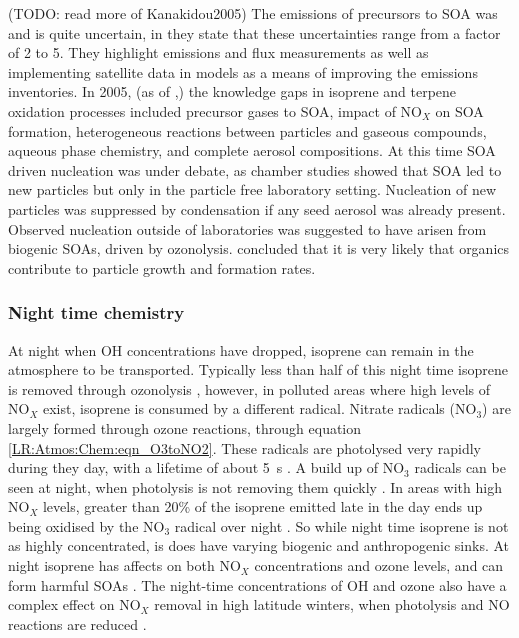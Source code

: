     (TODO: read more of Kanakidou2005)
    The emissions of precursors to SOA was and is quite uncertain, in \cite{Kanakidou2005} they state that these uncertainties range from a factor of 2 to 5.
    They highlight emissions and flux measurements as well as implementing satellite data in models as a means of improving the emissions inventories.
    In 2005, (as of \cite{Kanakidou2005},) the knowledge gaps in isoprene and terpene oxidation processes included precursor gases to SOA, impact of NO$_X$ on SOA formation, heterogeneous reactions between particles and gaseous compounds, aqueous phase chemistry, and complete aerosol compositions.
    At this time SOA driven nucleation was under debate, as chamber studies showed that SOA led to new particles but only in the particle free laboratory setting. 
    Nucleation of new particles was suppressed by condensation if any seed aerosol was already present.
    Observed nucleation outside of laboratories was suggested to have arisen from biogenic SOAs, driven by ozonolysis.
    \cite{Kanakidou2005} concluded that it is very likely that organics contribute to particle growth and formation rates.
    
    
    \subsubsection{Night time chemistry}
    At night when OH concentrations have dropped, isoprene can remain in the atmosphere to be transported. 
    Typically less than half of this night time isoprene is removed through ozonolysis \citep{AtkinsonArey2003}, however, in polluted areas where high levels of NO$_X$ exist, isoprene is consumed by a different radical.
    Nitrate radicals (NO$_3$) are largely formed through ozone reactions, through equation \ref{LR:Atmos:Chem:eqn_O3toNO2}.
    These radicals are photolysed very rapidly during they day, with a lifetime of about 5~s \citep{Atkinson2000}.
    A build up of NO$_3$ radicals can be seen at night, when photolysis is not removing them quickly \citep{Atkinson2000,Brown2009}.
    In areas with high NO$_X$ levels, greater than 20\% of the isoprene emitted late in the day ends up being oxidised by the NO$_3$ radical over night \citep{Brown2009}.
    So while night time isoprene is not as highly concentrated, is does have varying biogenic and anthropogenic sinks.
    At night isoprene has affects on both NO$_X$ concentrations and ozone levels, and can form harmful SOAs \citep{Brown2009, Mao2013}.
    The night-time  concentrations of OH and ozone also have a complex effect on NO$_X$ removal in high latitude winters, when photolysis and NO reactions are reduced \citep{Ayers2006}.
    
